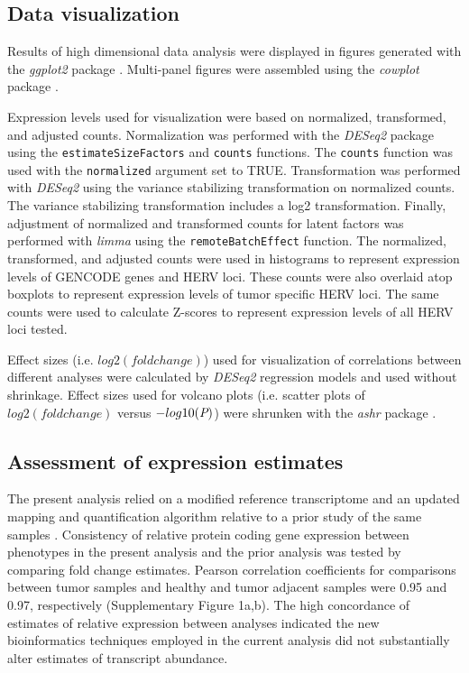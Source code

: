 \subsection*{Data visualization}
Results of high dimensional data analysis were displayed in figures generated with the \emph{ggplot2} package \citep{Wickham2016}.
Multi-panel figures were assembled using the \emph{cowplot} package \cite{Wilke2020}.

Expression levels used for visualization were based on normalized, transformed, and adjusted counts.
Normalization was performed with the \emph{DESeq2} package \citep{Love2014} using the \verb|estimateSizeFactors| and \verb|counts| functions.
The \verb|counts| function was used with the \verb|normalized| argument set to TRUE.
Transformation was performed with \emph{DESeq2} using the variance stabilizing transformation on normalized counts.
The variance stabilizing transformation includes a log2 transformation.
Finally, adjustment of normalized and transformed counts for latent factors was performed with \emph{limma} using the \verb|remoteBatchEffect| function.
The normalized, transformed, and adjusted counts were used in histograms to represent expression levels of GENCODE genes and HERV loci.
These counts were also overlaid atop boxplots to represent expression levels of tumor specific HERV loci.
The same counts were used to calculate Z-scores to represent expression levels of all HERV loci tested.

Effect sizes (i.e. $log2(fold change)$) used for visualization of correlations between different analyses were calculated by \emph{DESeq2} regression models and used without shrinkage.
Effect sizes used for volcano plots (i.e. scatter plots of $log2(fold change)$ versus $-log10(\emph{P})$) were shrunken with the \emph{ashr} package \citep{Stephens2020}.

\subsection*{Assessment of expression estimates}
The present analysis relied on a modified reference transcriptome and an updated mapping and quantification algorithm relative to a prior study of the same samples \citep{Dampier2020}.
Consistency of relative protein coding gene expression between phenotypes in the present analysis and the prior analysis was tested by comparing fold change estimates.
Pearson correlation coefficients for comparisons between tumor samples and healthy and tumor adjacent samples were 0.95 and 0.97, respectively (Supplementary Figure 1a,b).
The high concordance of estimates of relative expression between analyses indicated the new bioinformatics techniques employed in the current analysis did not substantially alter estimates of transcript abundance.
